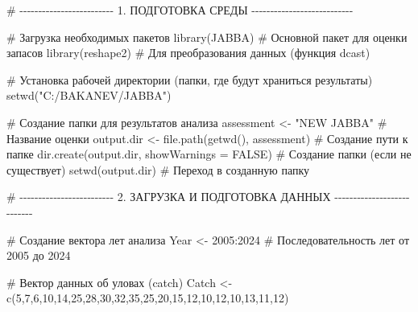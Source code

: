 \documentclass[
  letterpaper,
  DIV=11,
  numbers=noendperiod]{scrreprt}
\newenvironment{Shaded}{\begin{snugshade}}{\end{snugshade}}
\newcommand{\AttributeTok}[1]{\textcolor[rgb]{0.40,0.45,0.13}{#1}}
\newcommand{\CommentTok}[1]{\textcolor[rgb]{0.37,0.37,0.37}{#1}}
\newcommand{\ConstantTok}[1]{\textcolor[rgb]{0.56,0.35,0.01}{#1}}
\newcommand{\DecValTok}[1]{\textcolor[rgb]{0.68,0.00,0.00}{#1}}
\newcommand{\FunctionTok}[1]{\textcolor[rgb]{0.28,0.35,0.67}{#1}}
\newcommand{\NormalTok}[1]{\textcolor[rgb]{0.00,0.23,0.31}{#1}}
\newcommand{\OtherTok}[1]{\textcolor[rgb]{0.00,0.23,0.31}{#1}}
\newcommand{\SpecialCharTok}[1]{\textcolor[rgb]{0.37,0.37,0.37}{#1}}
\newcommand{\StringTok}[1]{\textcolor[rgb]{0.13,0.47,0.30}{#1}}
\begin{document}
\begin{Shaded}
\begin{Highlighting}[]
\CommentTok{\# {-}{-}{-}{-}{-}{-}{-}{-}{-}{-}{-}{-}{-}{-}{-}{-}{-}{-}{-}{-}{-}{-}{-}{-}{-} 1. ПОДГОТОВКА СРЕДЫ {-}{-}{-}{-}{-}{-}{-}{-}{-}{-}{-}{-}{-}{-}{-}{-}{-}{-}{-}{-}{-}{-}{-}{-}{-}{-}{-}}

\CommentTok{\# Загрузка необходимых пакетов}
\FunctionTok{library}\NormalTok{(JABBA) }\CommentTok{\# Основной пакет для оценки запасов}
\FunctionTok{library}\NormalTok{(reshape2) }\CommentTok{\# Для преобразования данных (функция dcast)}

\CommentTok{\# Установка рабочей директории (папки, где будут храниться результаты)}
\FunctionTok{setwd}\NormalTok{(}\StringTok{"C:/BAKANEV/JABBA"}\NormalTok{)}

\CommentTok{\# Создание папки для результатов анализа}
\NormalTok{assessment }\OtherTok{\textless{}{-}} \StringTok{"NEW JABBA"} \CommentTok{\# Название оценки}
\NormalTok{output.dir }\OtherTok{\textless{}{-}} \FunctionTok{file.path}\NormalTok{(}\FunctionTok{getwd}\NormalTok{(), assessment) }\CommentTok{\# Создание пути к папке}
\FunctionTok{dir.create}\NormalTok{(output.dir, }\AttributeTok{showWarnings =} \ConstantTok{FALSE}\NormalTok{) }\CommentTok{\# Создание папки (если не существует)}
\FunctionTok{setwd}\NormalTok{(output.dir) }\CommentTok{\# Переход в созданную папку}

\CommentTok{\# {-}{-}{-}{-}{-}{-}{-}{-}{-}{-}{-}{-}{-}{-}{-}{-}{-}{-}{-}{-}{-}{-}{-}{-}{-} 2. ЗАГРУЗКА И ПОДГОТОВКА ДАННЫХ {-}{-}{-}{-}{-}{-}{-}{-}{-}{-}{-}{-}{-}{-}{-}{-}{-}{-}{-}{-}{-}{-}{-}{-}{-}{-}{-}}

\CommentTok{\# Создание вектора лет анализа}
\NormalTok{Year }\OtherTok{\textless{}{-}} \DecValTok{2005}\SpecialCharTok{:}\DecValTok{2024} \CommentTok{\# Последовательность лет от 2005 до 2024}

\CommentTok{\# Вектор данных об уловах (catch)}
\NormalTok{Catch }\OtherTok{\textless{}{-}} \FunctionTok{c}\NormalTok{(}\DecValTok{5}\NormalTok{,}\DecValTok{7}\NormalTok{,}\DecValTok{6}\NormalTok{,}\DecValTok{10}\NormalTok{,}\DecValTok{14}\NormalTok{,}\DecValTok{25}\NormalTok{,}\DecValTok{28}\NormalTok{,}\DecValTok{30}\NormalTok{,}\DecValTok{32}\NormalTok{,}\DecValTok{35}\NormalTok{,}\DecValTok{25}\NormalTok{,}\DecValTok{20}\NormalTok{,}\DecValTok{15}\NormalTok{,}\DecValTok{12}\NormalTok{,}\DecValTok{10}\NormalTok{,}\DecValTok{12}\NormalTok{,}\DecValTok{10}\NormalTok{,}\DecValTok{13}\NormalTok{,}\DecValTok{11}\NormalTok{,}\DecValTok{12}\NormalTok{)}


\end{Highlighting}
\end{Shaded}
\end{document}
